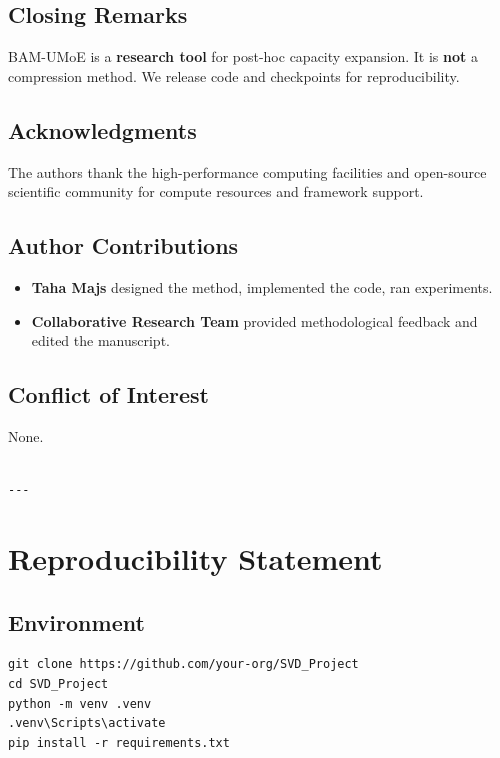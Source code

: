 \subsection{Closing Remarks}

BAM-UMoE is a \textbf{research tool} for post-hoc capacity expansion. It is 
\textbf{not} a compression method. We release code and checkpoints for 
reproducibility.

\subsection{Acknowledgments}

The authors thank the high-performance computing facilities and open-source scientific community for compute resources and framework support.

\subsection{Author Contributions}

\begin{itemize}
\item \textbf{Taha Majs} designed the method, implemented the code, ran experiments.
\item \textbf{Collaborative Research Team} provided methodological feedback and edited the manuscript.

\end{itemize}
\subsection{Conflict of Interest}

None.
\begin{lstlisting}

---
\end{lstlisting}

\section{Reproducibility Statement}

\subsection{Environment}

\begin{lstlisting}
git clone https://github.com/your-org/SVD_Project
cd SVD_Project
python -m venv .venv
.venv\Scripts\activate
pip install -r requirements.txt
\end{lstlisting}

